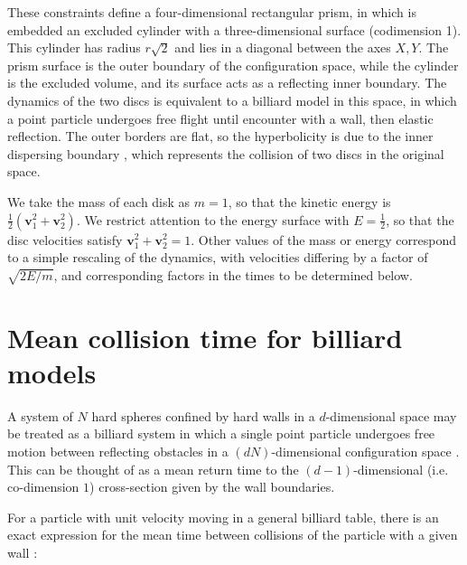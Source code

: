 \documentclass[superscriptaddress,pre,reprint,showpacs,onecolumn]{revtex4-1}
\begin{document}
These constraints define a four-dimensional
rectangular prism, in which is embedded an excluded cylinder with a three-dimensional surface
(codimension 1).
This cylinder has radius $r\sqrt{2}$ and lies
in  a diagonal between the axes $X, Y$.
The prism surface is the outer boundary of the configuration space,
while the cylinder is the excluded volume, and its surface
acts as a reflecting inner boundary.
The dynamics of the two discs is equivalent to a billiard model in this space, in which 
a point particle undergoes free flight until
encounter with a wall, then elastic reflection.
The outer borders are flat, so the
hyperbolicity is due to the inner dispersing
boundary \cite{Sim99}, which represents the collision of
two discs in the original space.


We take the mass of each disk as $m=1$, so that the kinetic energy
is $\frac{1}{2}(\mathbf{v}_1^2 + \mathbf{v}_2^2)$. We restrict attention to the energy surface with
$E = \frac{1}{2}$, so that the disc velocities satisfy $\mathbf{v}_1^2 + \mathbf{v}_2^2 = 1$.
Other values of the mass or energy correspond to a simple rescaling of the dynamics, with velocities differing
by a factor of
$\sqrt{2E/m}$, and corresponding factors in the times to be determined below.


\section{Mean collision time for billiard models}

\label{knownfacts}

A system of $N$ hard spheres confined by hard walls in a $d$-dimensional
space may be treated as a billiard system 
in which a single point  particle undergoes free motion between reflecting obstacles 
in a $ (d N) $-dimensional configuration space \cite{Sinai70, Sim99, MarkChern}. 
This can be thought of as a mean return time to the $(d-1)$-dimensional 
(i.e. co-dimension $1$) cross-section given by the wall boundaries.

For a particle with unit velocity moving in a general billiard table, there is 
an exact expression for the mean time between 
collisions of the particle with a given wall \cite{Chernov97}:
\end{document}
